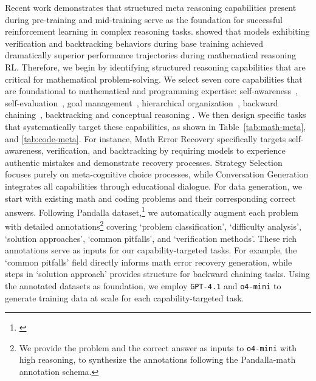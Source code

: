 \documentclass[table]{ai2style/ai2}
\begin{document}
{{Recent work demonstrates that structured meta reasoning capabilities present during pre-training and mid-training serve as the foundation for successful reinforcement learning in complex reasoning tasks. \citet{gandhi2025cognitive} showed that models exhibiting verification and backtracking behaviors during base training achieved dramatically superior performance trajectories during mathematical reasoning RL. 
Therefore, we begin by identifying structured reasoning capabilities that are critical for mathematical problem-solving. We select seven core capabilities that are foundational to mathematical and programming expertise: self-awareness~\citep{toy2024metacognitionneedusingintrospection,bfa322bf36e54a4ca19f9a73bee6184b}, self-evaluation~\citep{Fleming2017-FLESOD}, goal management~\citep{ACKERMAN2017607,GRIFFITHS201924}, hierarchical organization~\citep{Haupt2018}, backward chaining~\citep{Olieslagers2024}, backtracking and conceptual reasoning \citep{Markovits2015}. We then design specific tasks that systematically target these capabilities, as shown in Table~\ref{tab:math-meta}, and \ref{tab:code-meta}. For instance, Math Error Recovery specifically targets self-awareness, verification, and backtracking by requiring models to experience authentic mistakes and demonstrate recovery processes. Strategy Selection focuses purely on meta-cognitive choice processes, while Conversation Generation integrates all capabilities through educational dialogue. 
For data generation, we start with existing math \citep{deepscaler2025,moshkov2025aimo2} and coding \citep{tacoli,hendrycksapps2021,ahmad2025opencodereasoning} problems and their corresponding correct answers. Following Pandalla dataset,\footnote{\href{https://huggingface.co/datasets/pandalla/pandalla-math-dataset-v1.0}{}} we automatically augment each problem with detailed  annotations\footnote{We provide the problem and the correct answer as inputs to \texttt{o4-mini} with high reasoning, to synthesize the annotations following the Pandalla-math annotation schema.} covering `problem classification', `difficulty analysis', `solution approaches', `common pitfalls', and `verification methods'. These rich annotations serve as inputs for our capability-targeted tasks. For example, the `common pitfalls' field directly informs math error recovery generation, while steps in `solution approach' provides structure for backward chaining tasks. Using the annotated datasets as foundation, we employ \texttt{GPT-4.1} and \texttt{o4-mini} to generate training data at scale for each capability-targeted task.

}}
\end{document}

